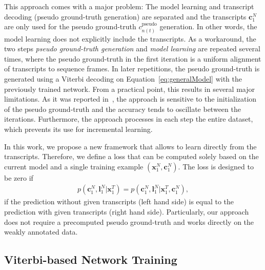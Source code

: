\documentclass[10pt,twocolumn,letterpaper]{article}
\begin{document}
This approach comes with a major problem:
The model learning and transcript decoding (\ie pseudo ground-truth generation) are
separated and the transcripts $ \mathbf{c}_1^N $ are only used for the pseudo ground-truth $c^{\text{pseudo}}_{n(t)}$
generation. In other words, the model learning does not explicitly include the transcripts.
As a workaround, the two steps \textit{pseudo ground-truth generation} and \textit{model learning}
are repeated several times, where the pseudo ground-truth in the first iteration
is a uniform alignment of transcripts to sequence frames.
In later repetitions, the pseudo ground-truth is generated using a Viterbi decoding on Equation~\eqref{eq:generalModel} with the previously trained network. From a practical point, this results in several major limitations. As it was reported in~\cite{richard2017weakly}, the approach is sensitive to the initialization of the pseudo ground-truth and the accuracy tends to oscillate between the iterations. Furthermore, the approach processes in each step the entire dataset, which prevents its use for incremental learning.              

In this work, we propose a new framework that allows to learn directly from the
transcripts. Therefore, we define a loss that can be computed solely based on the
current model and a single training example $ (\mathbf{x}_1^N, \mathbf{c}_1^N) $.
The loss is designed to be zero if
\begin{align}
    p(\mathbf{c}_1^N, \mathbf{l}_1^N | \mathbf{x}_1^T) = p(\mathbf{c}_1^N, \mathbf{l}_1^N | \mathbf{x}_1^T, \mathbf{c}_1^N),
\end{align}
\ie if the prediction without given transcripts (left hand side) is equal to the prediction
with given transcripts (right hand side).
Particularly, our approach does not require a precomputed pseudo ground-truth and works
directly on the weakly annotated data.


\subsection{Viterbi-based Network Training}
\label{sec:Viterbi}
\end{document}

